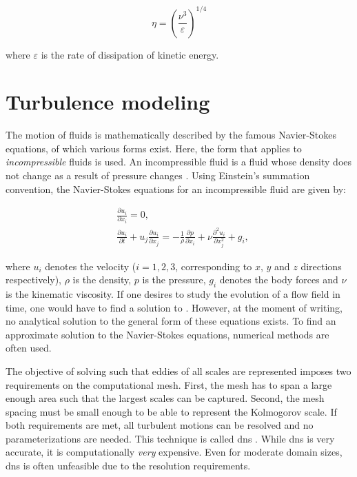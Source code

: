 \begin{equation}
    \eta = \left( \frac{\nu^3}{\varepsilon} \right)^{1/4}
    \label{eq:kolmogorov-length}
\end{equation}

where $\varepsilon$ is the rate of dissipation of kinetic energy.

\section{Turbulence modeling}
The motion of fluids is mathematically described by the famous Navier-Stokes equations, of which various forms exist. Here, the form that applies to \emph{incompressible} fluids is used. An incompressible fluid is a fluid whose density does not change as a result of pressure changes . Using Einstein's summation convention, the Navier-Stokes equations for an incompressible fluid are given by:

\begin{align}
    &\frac{\partial u_i}{\partial x_i} = 0, \label{eq:ns_mass_conservation}\\
    &\frac{\partial u_i}{\partial t} + u_j \frac{\partial u_i}{\partial x_j} = - \frac{1}{\rho} \frac{\partial p}{\partial x_i} + \nu \frac{\partial^2 u_i}{\partial x_j^2}+ g_i,
    \label{eq:ns_momentum}
\end{align}

where $u_i$ denotes the velocity ($i=1,2,3$, corresponding to $x$, $y$ and $z$ directions respectively), $\rho$ is the density, $p$ is the pressure, $g_i$ denotes the body forces and $\nu$ is the kinematic viscosity. If one desires to study the evolution of a flow field in time, one would have to find a solution to . However, at the moment of writing, no analytical solution to the general form of these equations exists. To find an approximate solution to the Navier-Stokes equations, numerical methods are often used. 

The objective of solving  such that eddies of all scales are represented imposes two requirements on the computational mesh. First, the mesh has to span a large enough area such that the largest scales can be captured. Second, the mesh spacing must be small enough to be able to represent the Kolmogorov scale. If both requirements are met, all turbulent motions can be resolved and no parameterizations are needed. This technique is called \acrfull{dns} \citep{popeTurbulentFlows2000}. While \acrshort{dns} is very accurate, it is computationally \emph{very} expensive. Even for moderate domain sizes, \acrshort{dns} is often unfeasible due to the resolution requirements.

